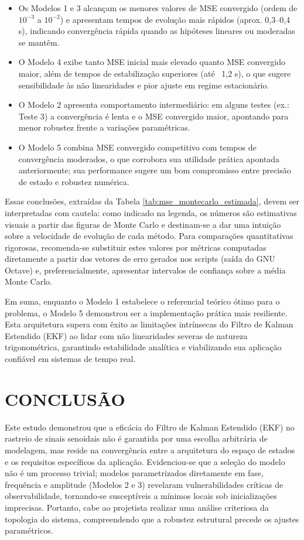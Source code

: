 \documentclass[a4paper,12pt]{article}
\begin{document}
    \begin{itemize}
        \item Os Modelos 1 e 3 alcançam os menores valores de MSE convergido (ordem de $10^{-3}$ a $10^{-2}$) e apresentam tempos de evolução mais rápidos (aprox. 0,3–0,4 s), indicando convergência rápida quando as hipóteses lineares ou moderadas se mantêm.
        \item O Modelo 4 exibe tanto MSE inicial mais elevado quanto MSE convergido maior, além de tempos de estabilização superiores (até ~1,2 s), o que sugere sensibilidade às não linearidades e pior ajuste em regime estacionário.
        \item O Modelo 2 apresenta comportamento intermediário: em alguns testes (ex.: Teste 3) a convergência é lenta e o MSE convergido maior, apontando para menor robustez frente a variações paramétricas.
        \item O Modelo 5 combina MSE convergido competitivo com tempos de convergência moderados, o que corrobora sua utilidade prática apontada anteriormente; sua performance sugere um bom compromisso entre precisão de estado e robustez numérica.
    \end{itemize}

    Essas conclusões, extraídas da Tabela \ref{tab:mse_montecarlo_estimada}, devem ser interpretadas com cautela: como indicado na legenda, os números são estimativas visuais a partir das figuras de Monte Carlo e destinam-se a dar uma intuição sobre a velocidade de evolução de cada método. Para comparações quantitativas rigorosas, recomenda-se substituir estes valores por métricas computadas diretamente a partir dos vetores de erro gerados nos scripts (saída do GNU Octave) e, preferencialmente, apresentar intervalos de confiança sobre a média Monte Carlo.

    Em suma, enquanto o Modelo 1 estabelece o referencial teórico ótimo para o problema, o Modelo 5 demonstrou ser a implementação prática mais resiliente. Esta arquitetura supera com êxito as limitações intrínsecas do Filtro de Kalman Estendido (EKF) ao lidar com não linearidades severas de natureza trigonométrica, garantindo estabilidade analítica e viabilizando sua aplicação confiável em sistemas de tempo real.

\newpage
\section{CONCLUSÃO}
\label{sec:conclusao}

Este estudo demonstrou que a eficácia do Filtro de Kalman Estendido (EKF) no rastreio de sinais senoidais não é garantida por uma escolha arbitrária de modelagem, mas reside na convergência entre a arquitetura do espaço de estados e os requisitos específicos da aplicação. Evidenciou-se que a seleção do modelo não é um processo trivial; modelos parametrizados diretamente em fase, frequência e amplitude (Modelos 2 e 3) revelaram vulnerabilidades críticas de observabilidade, tornando-se susceptíveis a mínimos locais sob inicializações imprecisas. Portanto, cabe ao projetista realizar uma análise criteriosa da topologia do sistema, compreendendo que a robustez estrutural precede os ajustes paramétricos.
\end{document}
